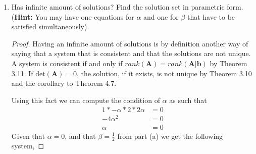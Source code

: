 \documentclass[11pt]{scrartcl}
\begin{document}
\begin{enumerate}[label=\alph*.]
	\item{
	      Has infinite amount of solutions? Find the solution set in parametric form.
	      (\textbf{Hint:} You may have one equations for $\alpha$ and one for $\beta$ that have to be satisfied simultaneously).
	      \begin{proof}
		      Having an infinite amount of solutions is by definition another way of saying
		      that a system that is consistent and that the solutions are not unique.
		      A system is consistent if and only if $rank(\mathbf{A}) = rank(\mathbf{A}|\mathbf{b})$
		      by Theorem 3.11. If det$(\mathbf{A}) = 0$, the solution, if it exists, is not unique by
		      Theorem 3.10 and the corollary to Theorem 4.7.

		      Using this fact we can compute the condition of $\alpha$ as such that
		      \begin{align*}
			      1*-\alpha*2*2\alpha & = 0 \\
			      -4\alpha^2          & = 0 \\
			      \alpha              & = 0
		      \end{align*}
		      Given that $\alpha = 0$, and that $\beta = \frac12$ from part (a)
		      we get the following system,


\end{proof}}
\end{enumerate}
\end{document}
